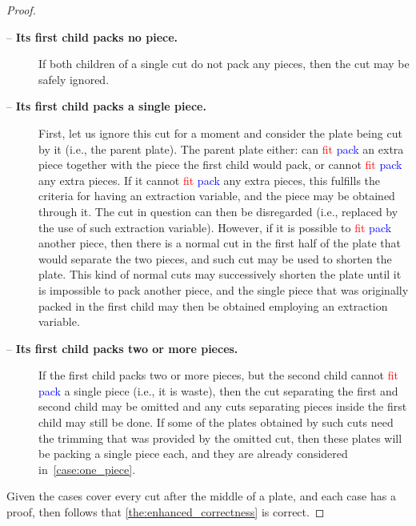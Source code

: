 \documentclass[ppgc,tese,english,formais,babel]{iiufrgs}
\newif\iffinalversion
\newcommand{\newtext}[1]{\iffinalversion%
#1%
\else%
\textcolor{blue}{#1}%
\fi%
}
\newcommand{\oldtext}[1]{\iffinalversion%
\else%
\textcolor{red}{#1}%
\fi%
}
\begin{document}
\begin{proof}
\begin{description}
\item[ -- \textbf{Its first child packs no piece.}]
If both children of a single cut do not pack any pieces, then the cut may be safely ignored.
\item[ -- \textbf{Its first child packs a single piece.}]
First, let us ignore this cut for a moment and consider the plate being cut by it (i.e., the parent plate).
The parent plate either: can \oldtext{fit}\newtext{pack} an extra piece together with the piece the first child would pack, or cannot \oldtext{fit}\newtext{pack} any extra pieces.
If it cannot \oldtext{fit}\newtext{pack} any extra pieces, this fulfills the criteria for having an extraction variable, and the piece may be obtained through it.
The cut in question can then be disregarded (i.e., replaced by the use of such extraction variable).
However, if it is possible to \oldtext{fit}\newtext{pack} another piece, then there is a normal cut in the first half of the plate that would separate the two pieces, and such cut may be used to shorten the plate.
This kind of normal cuts may successively shorten the plate until it is impossible to pack another piece, and the single piece that was originally packed in the first child may then be obtained employing an extraction variable.
\item[ -- \textbf{Its first child packs two or more pieces.}]
If the first child packs two or more pieces, but the second child cannot \oldtext{fit}\newtext{pack} a single piece (i.e., it is waste), then the cut separating the first and second child may be omitted and any cuts separating pieces inside the first child may still be done.
If some of the plates obtained by such cuts need the trimming that was provided by the omitted cut, then these plates will be packing a single piece each, and they are already considered in~\cref{case:one_piece}.
\end{description}

Given the cases cover every cut after the middle of a plate, and each case has a proof, then follows that \cref{the:enhanced_correctness} is correct.

\end{proof}
\end{document}
